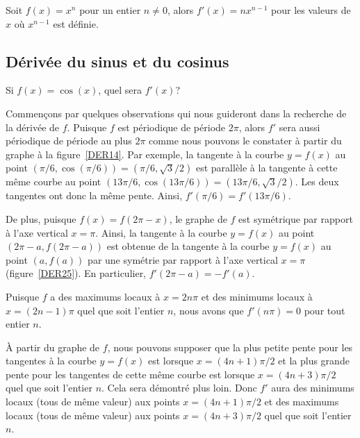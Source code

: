 {\begin{prop}
Soit $f(x) = x^n$ pour un entier $n\neq 0$, alors $f'(x) = n x^{n-1}$
pour les valeurs de $x$ où $x^{n-1}$ est définie.
\end{prop}

\subsection{Dérivée du sinus et du cosinus \life \eng}

Si $f(x) = \cos(x)$, quel sera $f'(x)$?

Commençons par quelques observations qui nous guideront dans la
recherche de la dérivée de $f$.  Puisque $f$ est périodique de période
$2\pi$, alors $f'$ sera aussi périodique de période au plus $2\pi$
comme nous pouvons le constater à partir du graphe à la
figure~\ref{DER14}.  Par exemple, la tangente à la courbe $y = f(x)$ au point
$(\pi/6,\cos(\pi/6)) = (\pi/6,\sqrt{3}/2)$ est parallèle à la tangente
à cette même courbe au point
$(13\pi/6,\cos(13\pi/6)) = (13\pi/6,\sqrt{3}/2)$.  Les deux 
tangentes ont donc la même pente.  Ainsi, $f'(\pi/6) = f'(13\pi/6)$.


De plus, puisque $f(x) = f(2\pi-x)$, le graphe de $f$ est symétrique
par rapport à l'axe vertical $x=\pi$.  Ainsi, la tangente à la courbe
$y=f(x)$ au point $(2\pi-a,f(2\pi-a))$ est obtenue de la tangente à la
courbe $y=f(x)$ au point $(a,f(a))$ par une symétrie par rapport à
l'axe vertical $x=\pi$ (figure~\ref{DER25}).  En particulier,
$f'(2\pi-a)=-f'(a)$.

Puisque $f$ a des maximums locaux à $x=2n\pi$ et des minimums locaux à
$x = (2n-1)\pi$ quel que soit l'entier $n$, nous avons que $f'(n\pi) = 0$ 
pour tout entier $n$.


À partir du graphe de $f$, nous pouvons supposer que la plus petite pente
pour les tangentes à la courbe $y=f(x)$ est lorsque $x=(4n+1)\pi/2$ et
la plus grande pente pour les tangentes de cette même courbe est
lorsque $x=(4n+3)\pi/2$ quel que soit l'entier $n$.  Cela sera
démontré plus loin.  Donc $f'$ aura des minimums locaux (tous de même
valeur) aux points $x=(4n+1)\pi/2$ et des maximums locaux (tous de
même valeur) aux points $x=(4n+3)\pi/2$ quel que soit l'entier $n$.

}
